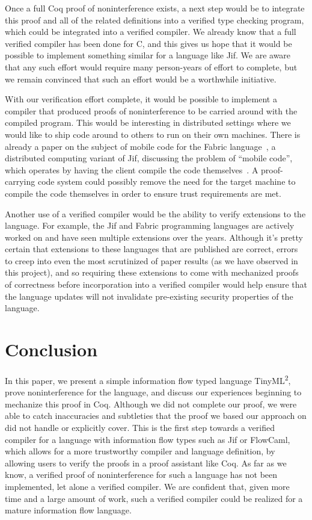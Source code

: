 \documentclass[a4paper,twocolumn]{article}
\newcommand{\langName}[0]{TinyML\textsuperscript{2}}
\theoremstyle{plain}
\theoremstyle{definition}
\begin{document}
Once a full Coq proof of noninterference exists, a next step would be to
integrate this proof and all of the related definitions into a verified type
checking program, which could be integrated into a verified compiler.  We
already know that a full verified compiler has been done for C, and this gives
us hope that it would be possible to implement something similar for a language
like Jif.  We are aware that any such effort would require many person-years of effort to complete, but we remain convinced that such an effort would be a worthwhile initiative.

With our verification effort complete, it would be possible to implement
a compiler that produced proofs of noninterference to be carried around with the
compiled program.  This would be interesting in distributed settings where we
would like to ship code around to others to run on their own machines.  There is
already a paper on the subject of mobile code for the Fabric
language~\cite{liu2009fabric}, a distributed computing variant of Jif,
discussing the problem of ``mobile code'', which operates by having the client
compile the code themselves~\cite{arden2012sharing}.  A proof-carrying code
system could possibly remove the need for the target machine to compile the code
themselves in order to ensure trust requirements are met.

Another use of a verified compiler would be the ability to verify extensions to
the language.  For example, the Jif and Fabric programming languages are
actively worked on and have seen multiple extensions over the years.  Although
it's pretty certain that extensions to these languages that are published are
correct, errors to creep into even the most scrutinized of paper results (as we
have observed in this project), and so requiring these extensions to come with
mechanized proofs of correctness before incorporation into a verified compiler
would help ensure that the language updates will not invalidate pre-existing
security properties of the language.

\section{Conclusion}
\label{sec:conclusion}

In this paper, we present a simple information flow typed language \langName,
prove noninterference for the language, and discuss our experiences beginning to
mechanize this proof in Coq.  Although we did not complete our proof, we were
able to catch inaccuracies and subtleties that the proof we based our approach
on did not handle or explicitly cover.  This is the first step towards a
verified compiler for a language with information flow types such as Jif or
FlowCaml, which allows for a more trustworthy compiler and language definition,
by allowing users to verify the proofs in a proof assistant like Coq.  As far as
we know, a verified proof of noninterference for such a language has not been
implemented, let alone a verified compiler.  We are confident that, given more
time and a large amount of work, such a verified compiler could be realized for
a mature information flow language.
\end{document}
